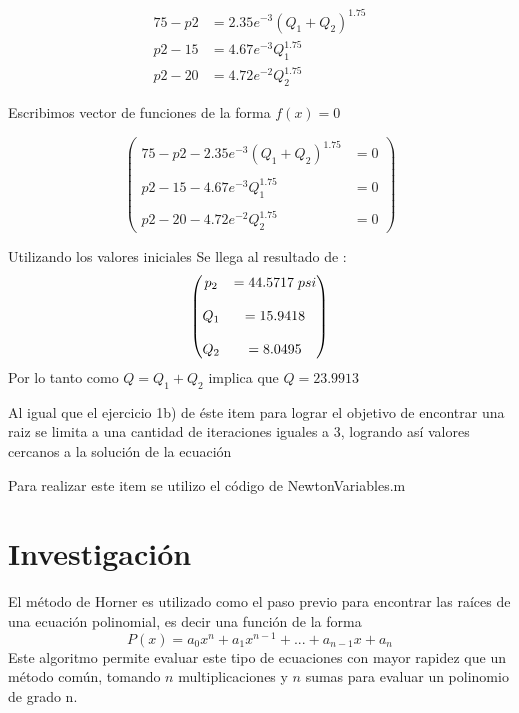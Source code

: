 \documentclass{udparticle}
\begin{document}
\begin{enumerate}
    \begin{align*} 
        75 - p2 &=  2.35e^{-3}(Q_1+Q_2)^{1.75} \\ 
        p2 - 15 &= 4.67e^{-3}Q_1^{1.75} \\
        p2 - 20 &= 4.72e^{-2}Q_2^{1.75}
    \end{align*}
    
    Escribimos vector de funciones de la forma $f(x) = 0$

   $$\begin{pmatrix}
        75 - p2 - 2.35e^{-3}(Q_1+Q_2)^{1.75} &= 0 \\
        \\
        p2 - 15 - 4.67e^{-3}Q_1^{1.75} &= 0  \\
        \\
        p2 - 20 - 4.72e^{-2}Q_2^{1.75} &= 0
    \end{pmatrix}$$
    
    Utilizando los valores iniciales Se llega al resultado de : 
    $$\begin{pmatrix}
        p_2 &=44.5717 \hspace{0.1cm} psi \\
        \\
        Q_1 &=15.9418 \\
        \\
        Q_2 &=8.0495
    \end{pmatrix}$$
    Por lo tanto como $Q = Q_1 + Q_2 $ implica que $ Q = 23.9913 $
    
    Al igual que el ejercicio 1b) de éste item para lograr el objetivo de encontrar una raiz se limita a una cantidad de iteraciones iguales a 3, logrando así valores cercanos a la solución de la ecuación
    
    Para realizar este item se utilizo el código de NewtonVariables.m
    \end{enumerate}
\section{Investigación}
    El método de Horner es utilizado como el paso previo para encontrar las raíces de una ecuación polinomial, es decir una función de la forma $$P(x)=a_{0}x^{n}+a_{1}x^{n-1}+...+a_{n-1}x+a_{n}$$
    Este algoritmo permite evaluar este tipo de ecuaciones con mayor rapidez que un método común, tomando $n$ multiplicaciones y $n$ sumas para evaluar un polinomio de grado n.
\end{document}
